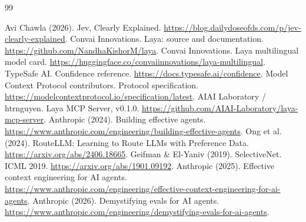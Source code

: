\begin{thebibliography}{99}
\raggedright\small
{} Avi Chawla (2026). Jev, Clearly Explained. \url{https://blog.dailydoseofds.com/p/jev-clearly-explained}.
 Convai Innovations. Laya: source and documentation. \url{https://github.com/NandhaKishorM/laya}.
 Convai Innovations. Laya multilingual model card. \url{https://huggingface.co/convaiinnovations/laya-multilingual}.
 TypeSafe AI. Confidence reference. \url{https://docs.typesafe.ai/confidence}.
 Model Context Protocol contributors. Protocol specification. \url{https://modelcontextprotocol.io/specification/latest}.
 AIAI Laboratory / htrnguyen. Laya MCP Server, v0.1.0. \url{https://github.com/AIAI-Laboratory/laya-mcp-server}.
 Anthropic (2024). Building effective agents. \url{https://www.anthropic.com/engineering/building-effective-agents}.
 Ong et al. (2024). RouteLLM: Learning to Route LLMs with Preference Data. \url{https://arxiv.org/abs/2406.18665}.
 Geifman \& El-Yaniv (2019). SelectiveNet. ICML 2019. \url{https://arxiv.org/abs/1901.09192}.
 Anthropic (2025). Effective context engineering for AI agents. \url{https://www.anthropic.com/engineering/effective-context-engineering-for-ai-agents}.
 Anthropic (2026). Demystifying evals for AI agents. \url{https://www.anthropic.com/engineering/demystifying-evals-for-ai-agents}.
\end{thebibliography}
